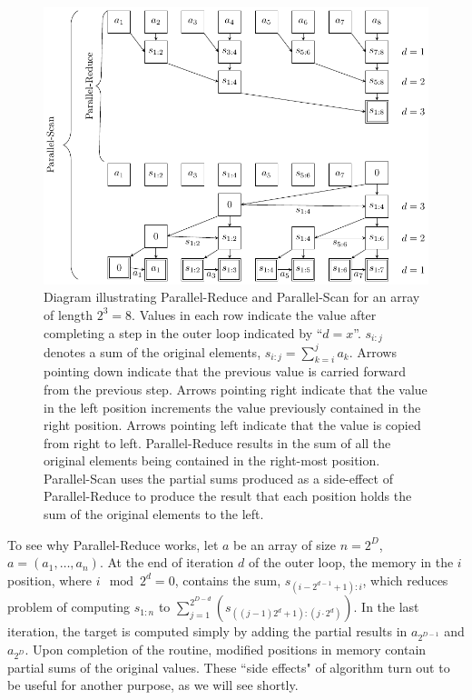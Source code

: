 {\begin{figure}
\includegraphics[width=\textwidth]{diagram}
\caption{\small Diagram illustrating Parallel-Reduce and Parallel-Scan for an array of length $2^3=8$. Values in each row indicate the value after completing a step in the outer loop indicated by ``$d=x$''. $s_{i:j}$ denotes a sum of the original elements, $s_{i:j}=\sum_{k=i}^j a_k$. Arrows pointing down indicate that the previous value is carried forward from the previous step. Arrows pointing right indicate that the value in the left position increments the value previously contained in the right position. Arrows pointing left indicate that the value is copied from right to left. Parallel-Reduce results in the sum of all the original elements being contained in the right-most position. Parallel-Scan uses the partial sums produced as a side-effect of Parallel-Reduce to produce the result that each position holds the sum of the original elements to the left.}
\label{scan-illustration}
\end{figure}

To see why Parallel-Reduce works, let $a$ be an array of size $n=2^D$, $a=(a_1,\ldots,a_n)$. At the end of iteration $d$ of the outer loop, the memory in the $i$ position, where $i \mod 2^d =0$, contains the sum, $s_{(i-2^{d-1}+1):i}$, which reduces problem of computing $s_{1:n}$ to $\sum_{j=1}^{2^{D-d}}(s_{((j-1) 2^d+1):(j\cdot 2^d)})$. In the last iteration, the target is computed simply by adding the partial results in $a_{2^{D-1}}$ and $a_{2^{D}}$. Upon completion of the routine, modified positions in memory contain partial sums of the original values. These ``side effects" of algorithm turn out to be useful for another purpose, as we will see shortly. 

}

